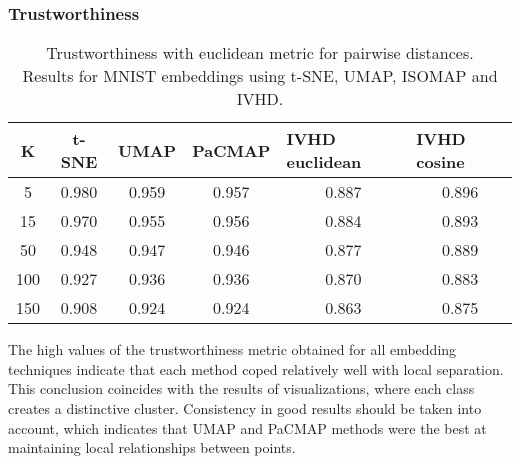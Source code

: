 \documentclass[12pt]{article}
\begin{document}
\clearpage
\subsubsection{Trustworthiness}
\begin{table}[h]
\centering
\caption{Trustworthiness with euclidean metric for pairwise distances. \\
Results for MNIST embeddings using t-SNE, UMAP, ISOMAP and IVHD.}
\begin{tabular}{|c|c|c|c|c|c|}
\hline
\textbf{K} & \textbf{t-SNE} & \textbf{UMAP} & \multicolumn{1}{l|}{\textbf{PaCMAP}} & \multicolumn{1}{l|}{\textbf{IVHD euclidean}} & \multicolumn{1}{l|}{\textbf{IVHD cosine}} \\ \hline
5          & 0.980          & 0.959         & 0.957                                & 0.887                                        & 0.896                                     \\ \hline
15         & 0.970          & 0.955         & 0.956                                & 0.884                                        & 0.893                                     \\ \hline
50         & 0.948          & 0.947         & 0.946                                & 0.877                                        & 0.889                                     \\ \hline
100        & 0.927          & 0.936         & 0.936                                & 0.870                                        & 0.883                                     \\ \hline
150        & 0.908          & 0.924         & 0.924                                & 0.863                                        & 0.875                                     \\ \hline
\end{tabular}
\end{table}
The high values of the trustworthiness metric obtained for all embedding techniques indicate that each method coped relatively well with local separation. This conclusion coincides with the results of visualizations, where each class creates a distinctive cluster. Consistency in good results should be taken into account, which indicates that UMAP and PaCMAP methods were the best at maintaining local relationships between points.
\end{document}
